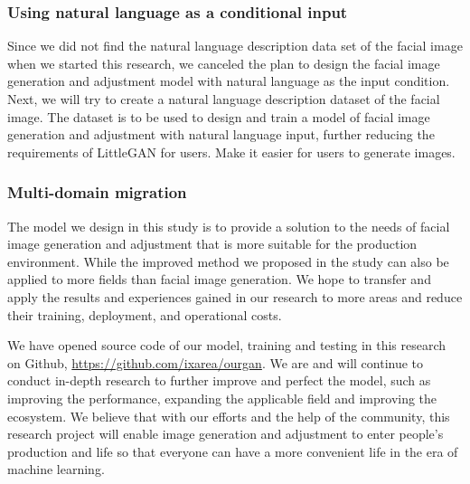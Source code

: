 \subsubsection*{Using natural language as a conditional input}
Since we did not find the natural language description data set of the facial image when we started this research, we canceled the plan to design the facial image generation and adjustment model with natural language as the input condition.
Next, we will try to create a natural language description dataset of the facial image.
The dataset is to be used to design and train a model of facial image generation and adjustment with natural language input, further reducing the requirements of LittleGAN for users.
Make it easier for users to generate images.
\subsubsection*{Multi-domain migration}
The model we design in this study is to provide a solution to the needs of facial image generation and adjustment that is more suitable for the production environment.
While the improved method we proposed in the study can also be applied to more fields than facial image generation.
We hope to transfer and apply the results and experiences gained in our research to more areas and reduce their training, deployment, and operational costs.

\vspace{4ex}

We have opened source code of our model, training and testing in this research on Github, \url{https://github.com/ixarea/ourgan}.
We are and will continue to conduct in-depth research to further improve and perfect the model,
    such as improving the performance, expanding the applicable field and improving the ecosystem.
We believe that with our efforts and the help of the community,
    this research project will enable image generation and adjustment to enter people's production and life
    so that everyone can have a more convenient life in the era of machine learning.






